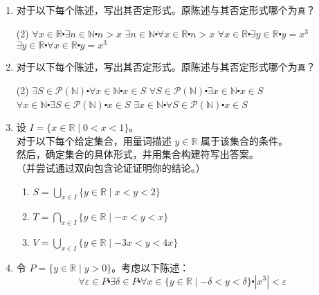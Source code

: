 \begin{enumerate}[label=(\arabic*)]
    \item 对于以下每个陈述，写出其否定形式。原陈述与其否定形式哪个为\verb|真|？
        \begin{tasks}[label=(\alph*)](2)
            \task $\forall x \in \mathbb{R} \centerdot \exists n \in \mathbb{N} \centerdot n > x$
            \task $\exists n \in \mathbb{N} \centerdot \forall x \in \mathbb{R} \centerdot n > x$
            \task $\forall x \in \mathbb{R} \centerdot \exists y \in \mathbb{R} \centerdot y = x^3$
            \task $\exists y \in \mathbb{R} \centerdot \forall x \in \mathbb{R} \centerdot y = x^3$
        \end{tasks}
    \item 对于以下每个陈述，写出其否定形式。原陈述与其否定形式哪个为\verb|真|？
        \begin{tasks}[label=(\alph*)](2)
            \task $\exists S \in \mathcal{P}(\mathbb{N}) \centerdot \forall x \in \mathbb{N} \centerdot x \in S$
            \task $\forall S \in \mathcal{P}(\mathbb{N}) \centerdot \exists x \in \mathbb{N} \centerdot x \in S$
            \task $\forall x \in \mathbb{N} \centerdot \exists S \in \mathcal{P}(\mathbb{N}) \centerdot x \in S$
            \task $\exists x \in \mathbb{N} \centerdot \forall S \in \mathcal{P}(\mathbb{N}) \centerdot x \in S$
        \end{tasks}
    \item 设 $I = \{x \in \mathbb{R} \mid 0 < x < 1\}$。\\
        对于以下每个给定集合，用量词描述 $y \in \mathbb{R}$ 属于该集合的条件。\\
        然后，确定集合的具体形式，并用集合构建符写出答案。\\
        （并尝试通过双向包含论证证明你的结论。）
        \begin{enumerate}[label=(\alph*)]
            \item $\displaystyle{S =\bigcup_{x \in I}\{y \in \mathbb{R} \mid x < y < 2\}}$
            \item $\displaystyle{T =\bigcap_{x \in I}\{y \in \mathbb{R} \mid -x < y < x\}}$
            \item $\displaystyle{V =\bigcup_{x \in I}\{y \in \mathbb{R} \mid -3x < y < 4x\}}$
        \end{enumerate}
    \item 令 $P = \{y \in \mathbb{R} \mid y > 0\}$。考虑以下陈述：
        \[\forall \varepsilon \in P \centerdot \exists \delta \in P \centerdot \forall x \in \{y \in \mathbb{R} \mid -\delta < y < \delta\} \centerdot |x^3| < \varepsilon\]

\end{enumerate}
